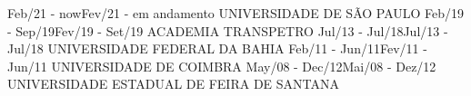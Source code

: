               {Feb/21 - now}{Fev/21 - em andamento}
              {UNIVERSIDADE DE S\~AO PAULO}
              {Feb/19 - Sep/19}{Fev/19 - Set/19}
              {ACADEMIA TRANSPETRO}
              {Jul/13 - Jul/18}{Jul/13 - Jul/18}
              {UNIVERSIDADE FEDERAL DA BAHIA}
              {Feb/11 - Jun/11}{Fev/11 - Jun/11}
              {UNIVERSIDADE DE COIMBRA}
              {May/08 - Dec/12}{Mai/08 - Dez/12}
              {UNIVERSIDADE ESTADUAL DE FEIRA DE SANTANA}
